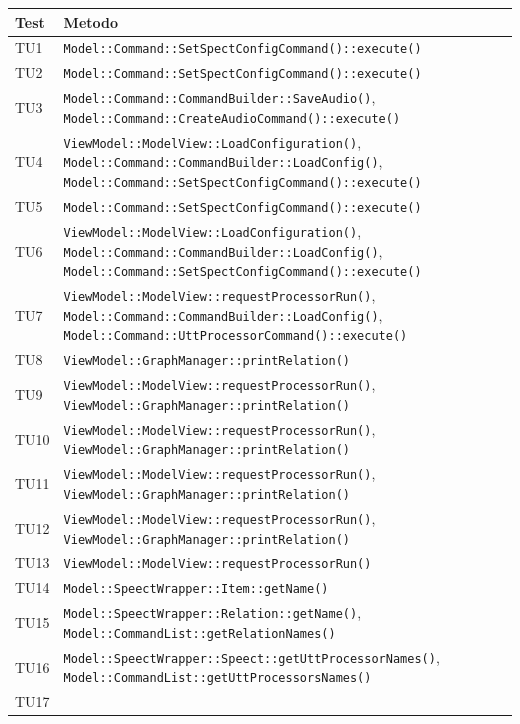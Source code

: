 \documentclass[openany,12pt,a4paper]{report}
\begin{document}
\begin{longtable}{| p{2.5cm} |p{11cm}|}
	\hline
	\textbf{Test} & \textbf{Metodo}\\
	\hline
	\endhead
	TU1&
	 \verb|Model::Command::SetSpectConfigCommand()::execute()|
	\\[1em]	
	\hline
	TU2&
	\verb|Model::Command::SetSpectConfigCommand()::execute()|
	\\[1em]	
	\hline	
	TU3& \verb|Model::Command::CommandBuilder::SaveAudio()|, \verb|Model::Command::CreateAudioCommand()::execute()|
	\\[1em]	
	\hline	
	TU4&\verb|ViewModel::ModelView::LoadConfiguration()|, \verb|Model::Command::CommandBuilder::LoadConfig()|, \verb|Model::Command::SetSpectConfigCommand()::execute()|
	\\[1em]	
	\hline	
	TU5& \verb|Model::Command::SetSpectConfigCommand()::execute()|
	\\[1em]	
	\hline	
	TU6&\verb|ViewModel::ModelView::LoadConfiguration()|, \verb|Model::Command::CommandBuilder::LoadConfig()|, \verb|Model::Command::SetSpectConfigCommand()::execute()|
	\\[1em]
	\hline	
	TU7&\verb|ViewModel::ModelView::requestProcessorRun()|, \verb|Model::Command::CommandBuilder::LoadConfig()|, \verb|Model::Command::UttProcessorCommand()::execute()|
	\\[1em]
	\hline	
	TU8&\verb|ViewModel::GraphManager::printRelation()|
	\\[1em]
	\hline	
	TU9&\verb|ViewModel::ModelView::requestProcessorRun()|, \verb|ViewModel::GraphManager::printRelation()|
	\\[1em]
	\hline	
	TU10&\verb|ViewModel::ModelView::requestProcessorRun()|, \verb|ViewModel::GraphManager::printRelation()|
	\\[1em]
	\hline	
	TU11&\verb|ViewModel::ModelView::requestProcessorRun()|, \verb|ViewModel::GraphManager::printRelation()|
	\\[1em]
	\hline	
	TU12&\verb|ViewModel::ModelView::requestProcessorRun()|, \verb|ViewModel::GraphManager::printRelation()|
	\\[1em]
	\hline
	TU13&\verb|ViewModel::ModelView::requestProcessorRun()|
	\\[1em]
	\hline
	TU14&\verb|Model::SpeectWrapper::Item::getName()|
	\\[1em]
	\hline	
	TU15&\verb|Model::SpeectWrapper::Relation::getName()|,
	\verb|Model::CommandList::getRelationNames()|
	\\[1em]
	\hline
	TU16&\verb|Model::SpeectWrapper::Speect::getUttProcessorNames()|,
	\verb|Model::CommandList::getUttProcessorsNames()|
	\\[1em]
	\hline
	TU17&
	\\[1em]
	\hline			
\end{longtable}
\end{document}
